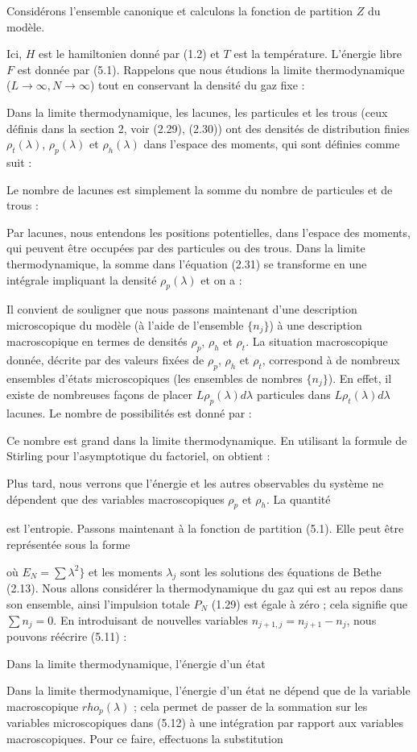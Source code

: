 Considérons l'ensemble canonique et calculons la fonction de partition $Z$ du modèle.

Ici, $H$ est le hamiltonien donné par (1.2) et $T$ est la température.  
L'énergie libre $F$ est donnée par (5.1). Rappelons que nous étudions  
la limite thermodynamique ($L \to \infty, N \to \infty$) tout en conservant  
la densité du gaz fixe :

Dans la limite thermodynamique, les lacunes, les particules et les trous  
(ceux définis dans la section 2, voir (2.29), (2.30)) ont des densités de  
distribution finies $\rho_t(\lambda)$, $\rho_p(\lambda)$ et $\rho_h(\lambda)$  
dans l'espace des moments, qui sont définies comme suit :

Le nombre de lacunes est simplement la somme du nombre de particules  
et de trous :

Par lacunes, nous entendons les positions potentielles, dans l'espace des moments,  
qui peuvent être occupées par des particules ou des trous. Dans la limite thermodynamique,  
la somme dans l'équation (2.31) se transforme en une intégrale impliquant la densité $\rho_p(\lambda)$  
et on a :

Il convient de souligner que nous passons maintenant d'une description microscopique  
du modèle (à l'aide de l'ensemble $\{n_j\}$) à une description macroscopique  
en termes de densités $\rho_p$, $\rho_h$ et $\rho_t$.  
La situation macroscopique donnée, décrite par des valeurs fixées de $\rho_p$, $\rho_h$ et $\rho_t$,  
correspond à de nombreux ensembles d'états microscopiques (les ensembles de nombres $\{n_j\}$).  
En effet, il existe de nombreuses façons de placer $L \rho_p(\lambda) d\lambda$ particules  
dans $L \rho_t(\lambda) d\lambda$ lacunes. Le nombre de possibilités est donné par :

Ce nombre est grand dans la limite thermodynamique.  
En utilisant la formule de Stirling pour l'asymptotique du factoriel, on obtient :

Plus tard, nous verrons que l'énergie et les autres observables du système 
ne dépendent que des variables macroscopiques \( \rho_p \) et \( \rho_h \). La quantité

est l'entropie. Passons maintenant à la fonction de partition (5.1). Elle peut être 
représentée sous la forme

où \( E_N = \sum \lambda^2 \} \) et les moments \( \lambda_j \) sont les solutions des équations de Bethe (2.13). 
Nous allons considérer la thermodynamique du gaz qui est au repos dans son ensemble, 
ainsi l'impulsion totale \( P_N \) (1.29) est égale à zéro ; cela signifie que \( \sum n_j = 0 \). 
En introduisant de nouvelles variables \( n_{j+1 , j} = n_{j+1} - n_j \), nous pouvons réécrire (5.11) :

Dans la limite thermodynamique, l'énergie d'un état

Dans la limite thermodynamique, l'énergie d'un état ne dépend que de la variable macroscopique \( rho_p(\lambda) \) ; cela permet de passer  
de la sommation sur les variables microscopiques dans (5.12) à une intégration par rapport aux variables macroscopiques.  
Pour ce faire, effectuons la substitution





